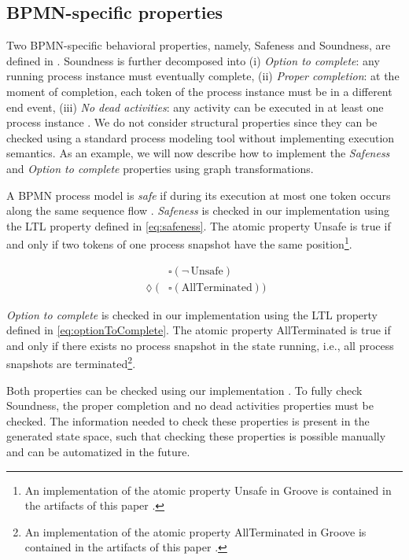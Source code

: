 \documentclass[adraft, copyright, creativecommons]{eptcs} %
\begin{document}
\subsection{BPMN-specific properties}
Two BPMN-specific behavioral properties, namely, Safeness and Soundness, are defined in \cite{corradiniClassificationBPMNCollaborations2018}.
Soundness is further decomposed into (i) \emph{Option to complete}: any running process instance must eventually complete, (ii) \emph{Proper completion}: at the moment of completion, each token of the process instance must be in a different end event, (iii) \emph{No dead activities}: any activity can be executed in at least one process instance \cite{corradiniClassificationBPMNCollaborations2018}.
We do not consider structural properties since they can be checked using a standard process modeling tool without implementing execution semantics.
As an example, we will now describe how to implement the \emph{Safeness} and \emph{Option to complete} properties using graph transformations.

A BPMN process model is \emph{safe} if during its execution at most one token occurs along the same sequence flow \cite{corradiniClassificationBPMNCollaborations2018}.
\emph{Safeness} is checked in our implementation using the LTL property defined in \eqref{eq:safeness}.
The atomic property \textsf{Unsafe} is true if and only if two tokens of one process snapshot have the same position\footnote{An implementation of the atomic property \textsf{Unsafe} in Groove is contained in the artifacts of this paper \cite{timkrauterArtifactsTERMGRAPH2022}.}.

\begin{align}
    & \square (\neg \,\text{Unsafe}) \label{eq:safeness} \\
    \lozenge (& \square(\text{AllTerminated})) \label{eq:optionToComplete}
\end{align}

\emph{Option to complete} is checked in our implementation using the LTL property defined in \eqref{eq:optionToComplete}.
The atomic property \textsf{AllTerminated} is true if and only if there exists no process snapshot in the state running, i.e., all process snapshots are terminated\footnote{An implementation of the atomic property \textsf{AllTerminated} in Groove is contained in the artifacts of this paper \cite{timkrauterArtifactsTERMGRAPH2022}.}.

Both properties can be checked using our implementation \cite{timkrauterArtifactsTERMGRAPH2022}.
To fully check Soundness, the proper completion and no dead activities properties must be checked.
The information needed to check these properties is present in the generated state space, such that checking these properties is possible manually and can be automatized in the future.
\end{document}
